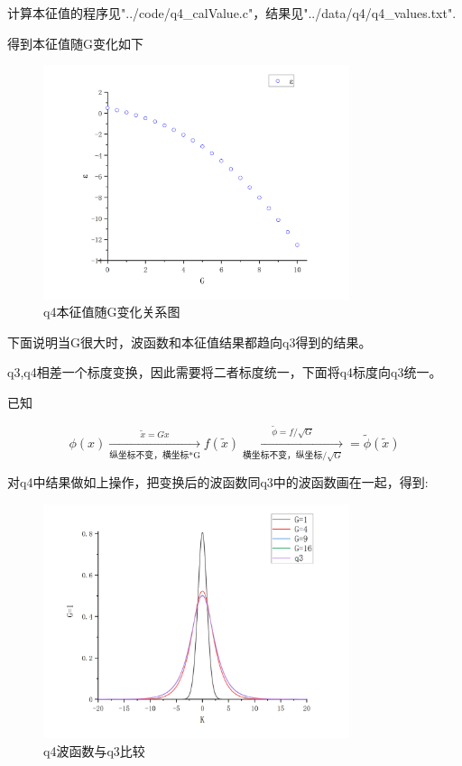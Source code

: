 \documentclass[10pt, a4paper]{article}
\begin{document}
    计算本征值的程序见"../code/q4_calValue.c"，结果见"../data/q4/q4_values.txt".

    得到本征值随G变化如下
    \begin{figure}[H]
      \centering
      \includegraphics[width=0.8\textwidth]{q4本征值随G变化关系图.jpg}
      \caption{q4本征值随G变化关系图}\label{fig:q4本征值随G变化关系图}
    \end{figure}

    下面说明当G很大时，波函数和本征值结果都趋向q3得到的结果。

    q3,q4相差一个标度变换，因此需要将二者标度统一，下面将q4标度向q3统一。

    已知

    \[\phi(x)\xrightarrow[\text{纵坐标不变，横坐标*G}]{\tilde{x}=Gx}f(\tilde x)\xrightarrow[\text{横坐标不变，纵坐标}/\sqrt{G}]{\tilde{\phi}=f/\sqrt{G}}=\tilde \phi(\tilde x)\]

    对q4中结果做如上操作，把变换后的波函数同q3中的波函数画在一起，得到:

    \begin{figure}[H]
      \centering
      \includegraphics[width=0.8\textwidth]{q4波函数与q3比较.jpg}
      \caption{q4波函数与q3比较}\label{fig:q4波函数与q3比较}
    \end{figure}
\end{document}
